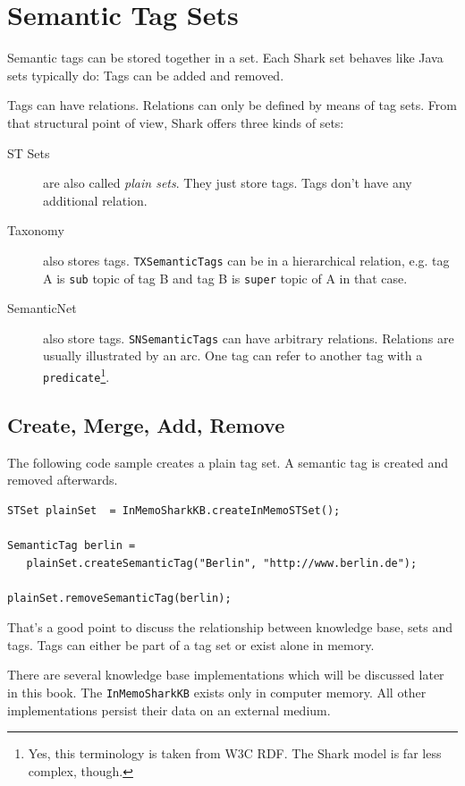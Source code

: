 \chapter{Semantic Tag Sets}
Semantic tags can be stored together in a set. Each Shark set behaves like Java sets typically do: Tags can be added and removed. 

Tags can have relations. Relations can only be defined by means of tag 
sets. From that structural point of view, Shark offers three kinds of sets:

\begin{description}
\item[ST Sets] are also called {\it plain sets}. They just store tags. Tags don't have any additional relation.
\item[Taxonomy] also stores tags. {\tt TXSemanticTags} can be in a hierarchical 
relation, e.g. tag A is {\tt sub} topic of tag B and tag B is {\tt super} topic of A in that case.
\item[SemanticNet] also store tags. {\tt SNSemanticTags} can have arbitrary relations. Relations are usually illustrated by an arc. One tag can refer to another tag with a {\tt predicate}\footnote{Yes, this terminology is taken from W3C RDF. The Shark model is far less complex, though.}.
\end{description}

\section{Create, Merge, Add, Remove}
The following code sample creates a plain tag set. A semantic tag is created and removed afterwards.

\begin{verbatim}
STSet plainSet  = InMemoSharkKB.createInMemoSTSet();

SemanticTag berlin = 
   plainSet.createSemanticTag("Berlin", "http://www.berlin.de");

plainSet.removeSemanticTag(berlin);
\end{verbatim}

That's a good point to discuss the relationship between knowledge base, sets and 
tags. Tags can either be part of a tag set or exist alone in memory.

There are several knowledge base implementations which will be discussed later in this book. The {\verb|InMemoSharkKB|} exists only in computer memory. All other implementations persist their data on an external medium.

